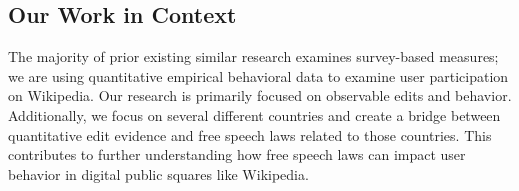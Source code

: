 \subsection{Our Work in Context}

The majority of prior existing similar research examines survey-based measures; we are using quantitative empirical behavioral data to examine user participation on Wikipedia. Our research is primarily focused on observable edits and behavior. Additionally, we focus on several different countries and create a bridge between quantitative edit evidence and free speech laws related to those countries. This contributes to further understanding how free speech laws can impact user behavior in digital public squares like Wikipedia.
